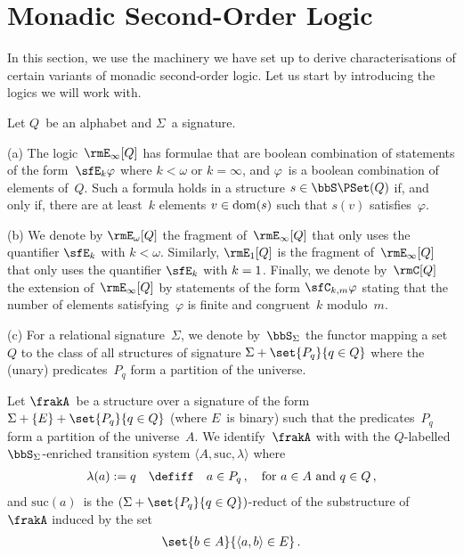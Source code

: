 \documentclass[10pt, fleqn]{scrartcl}
\DeclareRobustCommand*{\dom}{\qopname\relax o{dom}}
\newcommand*{\suc}{\mathrm{suc}}
\newcommand*{\?}{\kern .08em}
\begin{document}
\section{Monadic Second-Order Logic}   %
\label{Sect: MSO}


In this section, we use the machinery we have set up to derive characterisations of
certain variants of monadic second-order logic. Let us start by introducing the
logics we will work with.
\begin{Def}
Let $Q$~be an alphabet and $\Sigma$~a signature.

(a) The logic~$\rmE_\infty[Q]$ has formulae that are boolean combination of statements
of the form~$\sfE_k\varphi$ where $k < \omega$ or $k = \infty$, and
$\varphi$~is a boolean combination of elements of~$Q$.
Such a formula holds in a structure $s \in \bbS\PSet(Q)$ if, and only if,
there are at least~$k$ elements $v \in \dom(s)$ such that $s(v)$ satisfies~$\varphi$.

(b) We denote by $\rmE_\omega[Q]$ the fragment of~$\rmE_\infty[Q]$ that only uses the
quantifier $\sfE_k$ with $k < \omega$.
Similarly, $\rmE_1[Q]$ is the fragment of~$\rmE_\infty[Q]$ that only uses the
quantifier $\sfE_k$ with $k =\nobreak 1$.
Finally, we denote by~$\rmC[Q]$ the extension of~$\rmE_\infty[Q]$ by statements of the form
$\sfC_{k,m}\varphi$ stating that the number of elements satisfying~$\varphi$ is finite
and congruent~$k$ modulo~$m$.

(c) For a relational signature~$\Sigma$, we denote by~$\bbS_\Sigma$ the functor mapping
a set~$Q$ to the class of all structures of signature $\Sigma + \set{ P_q }{ q \in Q }$
where the (unary) predicates~$P_q$ form a partition of the universe.

Let $\frakA$~be a structure over a signature of the form
$\Sigma + \{E\} + \set{ P_q }{ q \in Q }$ (where $E$~is binary) such that
the predicates~$P_q$ form a partition of the universe~$A$.
We identify~$\frakA$ with with the $Q$-labelled $\bbS_\Sigma$-enriched transition
system $\langle A,\suc,\lambda\rangle$ where
\begin{align*}
  \lambda(a) := q \quad\defiff\quad a \in P_q\,, \quad\text{for } a \in A \text{ and } q \in Q\,,
\end{align*}
and $\suc(a)$~is the $(\Sigma + \set{ P_q }{ q \in Q })$-reduct of the substructure of~$\frakA$
induced by the set
\begin{align*}
  \set{ b \in A }{ \langle a,b\rangle \in E }\,.
\end{align*}


\end{Def}
\end{document}
